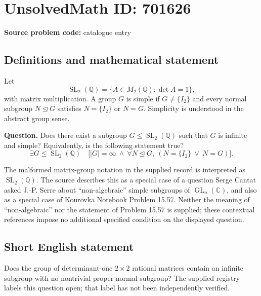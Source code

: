 \documentclass[11pt]{article}
\newcommand{\Q}{\mathbb{Q}}
\newcommand{\C}{\mathbb{C}}
\begin{document}
\section*{UnsolvedMath ID: 701626}
\textbf{Source problem code:} catalogue entry
\subsection{Definitions and mathematical statement}
Let
\[
\operatorname{SL}_2(\Q)=\{A\in M_2(\Q):\det A=1\},
\]
with matrix multiplication. A group \(G\) is simple if \(G\ne\{I_2\}\) and every normal subgroup \(N\trianglelefteq G\) satisfies \(N=\{I_2\}\) or \(N=G\). Simplicity is understood in the abstract group sense.

\textbf{Question.} Does there exist a subgroup \(G\leq\operatorname{SL}_2(\Q)\) such that \(G\) is infinite and simple? Equivalently, is the following statement true?
\[
\exists G\leq\operatorname{SL}_2(\Q)\quad
\bigl[|G|=\infty\ \land\ 
\forall N\trianglelefteq G,\ (N=\{I_2\}\ \lor\ N=G)\bigr].
\]

The malformed matrix-group notation in the supplied record is interpreted as \(\operatorname{SL}_2(\Q)\). The source describes this as a special case of a question Serge Cantat asked J.-P. Serre about ``non-algebraic'' simple subgroups of \(\operatorname{GL}_n(\C)\), and also as a special case of Kourovka Notebook Problem 15.57. Neither the meaning of ``non-algebraic'' nor the statement of Problem 15.57 is supplied; these contextual references impose no additional specified condition on the displayed question.
\subsection{Short English statement}
Does the group of determinant-one \(2\times2\) rational matrices contain an infinite subgroup with no nontrivial proper normal subgroup? The supplied registry labels this question open; that label has not been independently verified.
\end{document}
